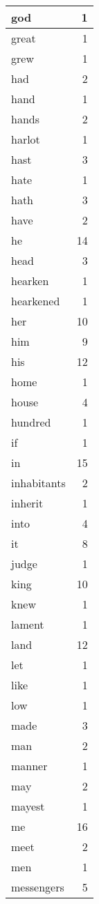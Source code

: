 \begin{center}
\begin{longtable}{l|r}
god & 1\\ \hline 
great & 1\\ \hline 
grew & 1\\ \hline 
had & 2\\ \hline 
hand & 1\\ \hline 
hands & 2\\ \hline 
harlot & 1\\ \hline 
hast & 3\\ \hline 
hate & 1\\ \hline 
hath & 3\\ \hline 
have & 2\\ \hline 
he & 14\\ \hline 
head & 3\\ \hline 
hearken & 1\\ \hline 
hearkened & 1\\ \hline 
her & 10\\ \hline 
him & 9\\ \hline 
his & 12\\ \hline 
home & 1\\ \hline 
house & 4\\ \hline 
hundred & 1\\ \hline 
if & 1\\ \hline 
in & 15\\ \hline 
inhabitants & 2\\ \hline 
inherit & 1\\ \hline 
into & 4\\ \hline 
it & 8\\ \hline 
judge & 1\\ \hline 
king & 10\\ \hline 
knew & 1\\ \hline 
lament & 1\\ \hline 
land & 12\\ \hline 
let & 1\\ \hline 
like & 1\\ \hline 
low & 1\\ \hline 
made & 3\\ \hline 
man & 2\\ \hline 
manner & 1\\ \hline 
may & 2\\ \hline 
mayest & 1\\ \hline 
me & 16\\ \hline 
meet & 2\\ \hline 
men & 1\\ \hline 
messengers & 5\\ \hline 

\end{longtable}
\end{center}
